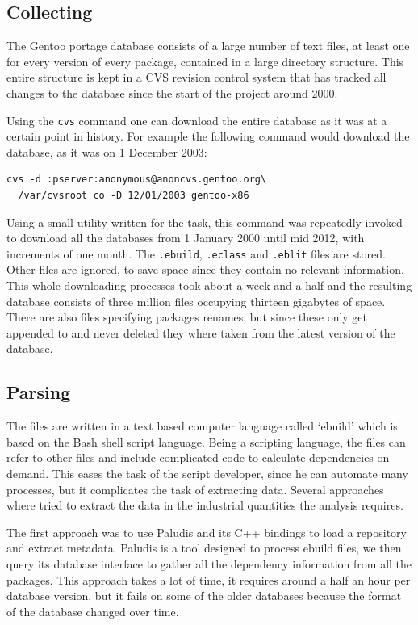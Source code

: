 \documentclass[smallextended,final]{svjour3}
\begin{document}
\subsection{Collecting}

The Gentoo portage database consists of a large number of text files, at least one for every version of every package, contained in a large directory structure. This entire structure is kept in a CVS revision control system that has tracked all changes to the database since the start of the project around 2000.

Using the \verb|cvs| command one can download the entire database as it was at a certain point in history. For example the following command would download the database, as it was on 1 December 2003:

\begin{verbatim}
cvs -d :pserver:anonymous@anoncvs.gentoo.org\
  /var/cvsroot co -D 12/01/2003 gentoo-x86
\end{verbatim}

Using a small utility written for the task, this command was repeatedly invoked to download all the databases from 1 January 2000 until mid 2012, with increments of one month. The \verb|.ebuild|, \verb|.eclass| and \verb|.eblit| files are stored. Other files are ignored, to save space since they contain no relevant information. This whole downloading processes took about a week and a half and the resulting database consists of three million files occupying thirteen gigabytes of space. There are also files specifying packages renames, but since these only get appended to and never deleted they where taken from the latest version of the database.

\subsection{Parsing}

The files are written in a text based computer language called `ebuild' which is based on the Bash shell script language. Being a scripting language, the files can refer to other files and include complicated code to calculate dependencies on demand. This eases the task of the script developer, since he can automate many processes, but it complicates the task of extracting data. Several approaches where tried to extract the data in the industrial quantities the analysis requires.

The first approach was to use Paludis and its C++ bindings to load a repository and extract metadata. Paludis is a tool designed to process ebuild files, we then query its database interface to gather all the dependency information from all the packages. This approach takes a lot of time, it requires around a half an hour per database version, but it fails on some of the older databases because the format of the database changed over time.
\end{document}
